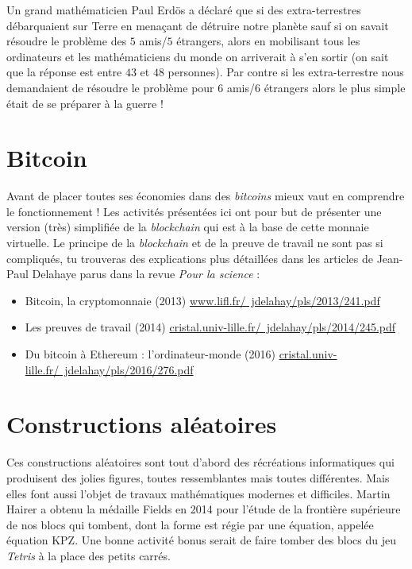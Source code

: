 \documentclass[11pt,class=report,crop=false]{standalone}
\begin{document}
Un grand mathématicien Paul Erd\"os a déclaré que si des extra-terrestres débarquaient sur Terre en menaçant de détruire notre planète sauf si on savait résoudre le problème des $5$ amis/$5$ étrangers, alors en mobilisant tous les ordinateurs et les mathématiciens du monde on arriverait à s'en sortir (on sait que la réponse est entre $43$ et $48$ personnes). Par contre si les extra-terrestre nous demandaient de résoudre le problème pour $6$ amis/$6$ étrangers alors le plus simple était de se préparer à la guerre !


\section{Bitcoin}

Avant de placer toutes ses économies dans des \emph{bitcoins} mieux vaut en comprendre le fonctionnement ! Les activités présentées ici ont pour but de présenter une version (très) simplifiée de la \emph{blockchain} qui est à la base de cette monnaie virtuelle.
Le principe de la \emph{blockchain} et de la preuve de travail ne sont pas si compliqués, tu trouveras des explications plus détaillées dans les articles de Jean-Paul Delahaye parus dans la revue \emph{Pour la science} :
\begin{itemize}
  \item Bitcoin, la cryptomonnaie (2013) 
  \href{http://www.lifl.fr/~jdelahay/pls/2013/241.pdf}{www.lifl.fr/~jdelahay/pls/2013/241.pdf}
  \item Les preuves de travail (2014) 
  \href{http://cristal.univ-lille.fr/~jdelahay/pls/2014/245.pdf}{cristal.univ-lille.fr/~jdelahay/pls/2014/245.pdf}
  \item Du bitcoin à Ethereum : l’ordinateur-monde (2016)
  \href{http://cristal.univ-lille.fr/~jdelahay/pls/2016/276.pdf}{cristal.univ-lille.fr/~jdelahay/pls/2016/276.pdf}
\end{itemize}



\section{Constructions aléatoires}

Ces constructions aléatoires sont tout d'abord des récréations informatiques qui produisent des jolies figures, toutes ressemblantes mais toutes différentes. Mais elles font aussi l'objet de travaux mathématiques modernes et difficiles. Martin Hairer a obtenu la médaille Fields en 2014 pour l'étude de la frontière supérieure de nos blocs qui tombent, dont la forme est régie par une équation, appelée \og{}équation KPZ\fg{}.
Une bonne activité bonus serait de faire tomber des blocs du jeu \emph{Tetris} à la place des petits carrés.
\end{document}
